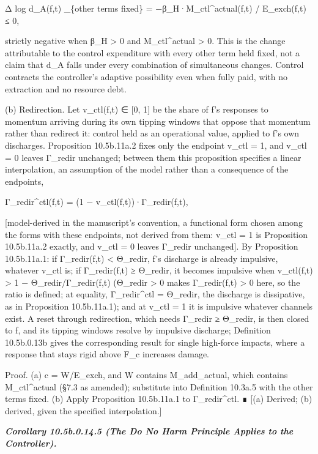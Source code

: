 \documentclass[
]{article}
\begin{document}
Δ log d\_A(f,t) \textbar\_\{other terms fixed\} =
−β\_H·M\_ctl\^{}actual(f,t) / E\_exch(f,t) ≤ 0,

strictly negative when β\_H \textgreater{} 0 and M\_ctl\^{}actual
\textgreater{} 0. This is the change attributable to the control
expenditure with every other term held fixed, not a claim that d\_A
falls under every combination of simultaneous changes. Control contracts
the controller's adaptive possibility even when fully paid, with no
extraction and no resource debt.

(b) Redirection. Let v\_ctl(f,t) ∈ {[}0, 1{]} be the share of f's
responses to momentum arriving during its own tipping windows that
oppose that momentum rather than redirect it: control held as an
operational value, applied to f's own discharges. Proposition
10.5b.11a.2 fixes only the endpoint v\_ctl = 1, and v\_ctl = 0 leaves
Γ\_redir unchanged; between them this proposition specifies a linear
interpolation, an assumption of the model rather than a consequence of
the endpoints,

Γ\_redir\^{}ctl(f,t) = (1 − v\_ctl(f,t))·Γ\_redir(f,t),

{[}model-derived in the manuscript's convention, a functional form
chosen among the forms with these endpoints, not derived from them:
v\_ctl = 1 is Proposition 10.5b.11a.2 exactly, and v\_ctl = 0 leaves
Γ\_redir unchanged{]}. By Proposition 10.5b.11a.1: if Γ\_redir(f,t)
\textless{} Θ\_redir, f's discharge is already impulsive, whatever
v\_ctl is; if Γ\_redir(f,t) ≥ Θ\_redir, it becomes impulsive when
v\_ctl(f,t) \textgreater{} 1 − Θ\_redir/Γ\_redir(f,t) (Θ\_redir
\textgreater{} 0 makes Γ\_redir(f,t) \textgreater{} 0 here, so the ratio
is defined; at equality, Γ\_redir\^{}ctl = Θ\_redir, the discharge is
dissipative, as in Proposition 10.5b.11a.1); and at v\_ctl = 1 it is
impulsive whatever channels exist. A reset through redirection, which
needs Γ\_redir ≥ Θ\_redir, is then closed to f, and its tipping windows
resolve by impulsive discharge; Definition 10.5b.0.13b gives the
corresponding result for single high-force impacts, where a response
that stays rigid above F\_c increases damage.

Proof. (a) c = W/E\_exch, and W contains M\_add\_actual, which contains
M\_ctl\^{}actual (§7.3 as amended); substitute into Definition 10.3a.5
with the other terms fixed. (b) Apply Proposition 10.5b.11a.1 to
Γ\_redir\^{}ctl. ∎ {[}(a) Derived; (b) derived, given the specified
interpolation.{]}

\emph{\textbf{Corollary 10.5b.0.14.5 (The Do No Harm Principle Applies
to the Controller).}}
\end{document}
